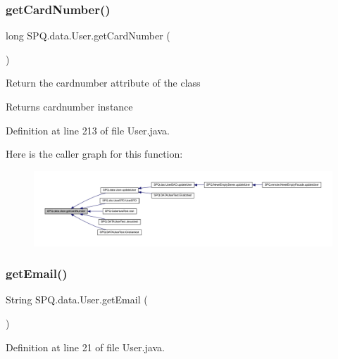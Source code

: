 \subsubsection{\texorpdfstring{get\+Card\+Number()}{getCardNumber()}}
{\footnotesize\ttfamily long S\+P\+Q.\+data.\+User.\+get\+Card\+Number (\begin{DoxyParamCaption}{ }\end{DoxyParamCaption})}

Return the cardnumber attribute of the class \begin{DoxyReturn}{Returns}
cardnumber instance 
\end{DoxyReturn}


Definition at line 213 of file User.\+java.

Here is the caller graph for this function\+:\nopagebreak
\begin{figure}[H]
\begin{center}
\leavevmode
\includegraphics[width=350pt]{class_s_p_q_1_1data_1_1_user_ab847d5c61fe4980ae2a15a537b22939b_icgraph}
\end{center}
\end{figure}
\mbox{\label{class_s_p_q_1_1data_1_1_user_a4f3ae0062ee7529314a5b791707ff4b4}} 
\subsubsection{\texorpdfstring{get\+Email()}{getEmail()}\hspace{0.1cm}{\footnotesize\ttfamily [1/4]}}
{\footnotesize\ttfamily String S\+P\+Q.\+data.\+User.\+get\+Email (\begin{DoxyParamCaption}{ }\end{DoxyParamCaption})}



Definition at line 21 of file User.\+java.

\mbox{\label{class_s_p_q_1_1data_1_1_user_a4f3ae0062ee7529314a5b791707ff4b4}} 
